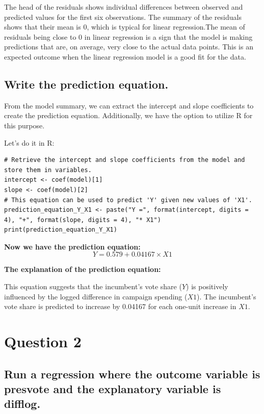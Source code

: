 \documentclass[12pt]{article}
\begin{document}
The head of the residuals shows individual differences between observed and predicted values for the first six observations. The summary of the residuals shows that their mean is 0, which is typical for linear regression.The mean of residuals being close to 0 in linear regression is a sign that the model is making predictions that are, on average, very close to the actual data points. This is an expected outcome when the linear regression model is a good fit for the data.

\subsection{ Write the prediction equation.}

From the model summary, we can extract the intercept and slope coefficients to create the prediction equation. Additionally, we have the option to utilize R for this purpose.

Let's do it in R:
\begin{lstlisting}
# Retrieve the intercept and slope coefficients from the model and store them in variables.
intercept <- coef(model)[1]
slope <- coef(model)[2]
# This equation can be used to predict 'Y' given new values of 'X1'.
prediction_equation_Y_X1 <- paste("Y =", format(intercept, digits = 4), "+", format(slope, digits = 4), "* X1")
print(prediction_equation_Y_X1)   
\end{lstlisting}

\textbf{Now we have the prediction equation:}
\begin{equation}
Y = 0.579 + 0.04167 \times X1
\end{equation}


\textbf{The explanation of the prediction equation:}

This equation suggests that the incumbent's vote share (\(Y\)) is positively influenced by the logged difference in campaign spending (\(X1\)). The incumbent's vote share is predicted to increase by 0.04167 for each one-unit increase in \(X1\).


\section{Question 2}
\subsection{Run a regression where the outcome variable is presvote and the explanatory variable is difflog.}
\end{document}
